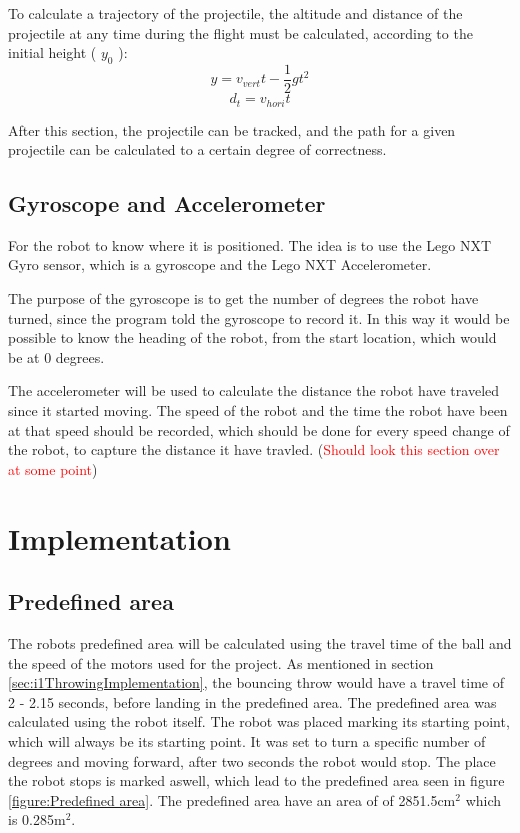 To calculate a trajectory of the projectile, the altitude and distance of the projectile at any time during the flight must be calculated, according to the initial height ( \(y_{0}\) ):
\[y = v_{vert}t - \dfrac{1}{2} gt^2\]
\[d_{t} = v_{hori}t\]

After this section, the projectile can be tracked, and the path for a given projectile can be calculated to a certain degree of correctness. 

\subsection{Gyroscope and Accelerometer}
\label{sec:i1Gyroscope and Accelerometer}
For the robot to know where it is positioned. The idea is to use the Lego NXT Gyro sensor, which is a gyroscope and the Lego NXT Accelerometer. 

The purpose of the gyroscope is to get the number of degrees the robot have turned, since the program told the gyroscope to record it. In this way it would be possible to know the heading of the robot, from the start location, which would be at 0 degrees. 

The accelerometer will be used to calculate the distance the robot have traveled since it started moving. The speed of the robot and the time the robot have been at that speed should be recorded, which should be done for every speed change of the robot, to capture the distance it have travled.
(\textcolor{red}{Should look this section over at some point})

\section{Implementation}
\label{sec:i1Implementation}

\subsection{Predefined area}
\label{sec:i1Predefined areaImplementation}
The robots predefined area will be calculated using the travel time of the ball and the speed of the motors used for the project. 
As mentioned in  section \ref{sec:i1ThrowingImplementation}, the bouncing throw would have a travel time of 2 - 2.15 seconds, before landing in the predefined area. The predefined area was calculated using the robot itself. The robot was placed marking its starting point, which will always be its starting point. It was set to turn a specific number of degrees and moving forward, after two seconds the robot would stop. The place the robot stops is marked aswell, which lead to the predefined area seen in figure \ref{figure:Predefined area}. The predefined area have an area of of 2851.5cm\begin{math}^2\end{math} which is 0.285m\begin{math}^2\end{math}.

